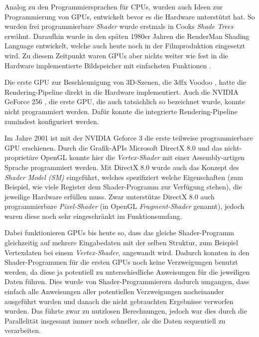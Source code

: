 \documentclass[oneside]{ausarbeitung}
\newcommand*{\quotize}[1]{\glqq #1\grqq}
\begin{document}
Analog zu den Programmiersprachen für \ac{CPU}s, wurden auch Ideen zur Programmierung von \ac{GPU}s, entwickelt bevor es die Hardware unterstützt hat. So wurden frei programmierbare \textit{Shader} wurde erstmals in Cooks \textit{Shade Trees} \cite{cook:shade_trees} erwähnt. Daraufhin wurde in den späten 1980er Jahren die RenderMan Shading Language \cite{pixar:rsl} entwickelt, welche auch heute noch in der Filmproduktion eingesetzt wird. Zu diesem Zeitpunkt waren \ac{GPU}s aber nichts weiter wie fest in die Hardware implementierte Bildspeicher mit einfachsten Funktionen \cite[Vgl.][]{gpu_history}.

Die erste \ac{GPU} zur Beschleunigung von 3D-Szenen, die 3dfx Voodoo \cite{wikipedia:3dfx_voodoo}, hatte die Rendering-Pipeline direkt in die Hardware implementiert. Auch die NVIDIA GeForce 256 \cite{wikipedia:geforce256}, die erste \ac{GPU}, die auch tatsächlich so bezeichnet wurde, konnte nicht programmiert werden. Dafür konnte die integrierte Rendering-Pipeline zumindest konfiguriert werden.

Im Jahre 2001 ist mit der NVIDIA Geforce 3 \cite{wikipedia:geforce3} die erste teilweise programmierbare \ac{GPU} erschienen. Durch die Grafik-APIs Microsoft DirectX 8.0 und das nicht-proprietäre OpenGL konnte hier die \textit{Vertex-Shader} mit einer Assembly-artigen Sprache programmiert werden. Mit DirectX 8.0 wurde auch das Konzept des \textit{Shader Model (SM)} \cite[Vgl.][Shader model comparison]{wikipedia:hlsl} eingeführt, welches spezifiziert welche Eigenschaften (zum Beispiel, wie viele Register dem Shader-Programm zur Verfügung stehen), die jeweilige Hardware erfüllen muss. Zwar unterstütze DirectX 8.0 auch programmierbare \textit{Pixel-Shader} (in OpenGL \textit{Fragment-Shader} genannt), jedoch waren diese noch sehr eingeschränkt im Funktionsumfang.

Dabei funktionieren \ac{GPU}s bis heute so, dass das gleiche Shader-Programm gleichzeitig auf mehrere Eingabedaten mit der selben Struktur, zum Beispiel Vertexdaten bei einem \textit{Vertex-Shader}, angewandt wird. Dadurch konnten in den Shader-Programmen für die ersten \ac{GPU}s noch keine Verzweigungen benutzt werden, da diese ja potentiell zu unterschiedliche Anweisungen für die jeweiligen Daten führen. Dies wurde von Shader-Programmierern dadurch umgangen, dass einfach alle Anweisungen aller potentiellen Verzweigungen nacheinander ausgeführt wurden und danach die nicht gebrauchten Ergebnisse verworfen wurden. Das führte zwar zu \quotize{nutzlosen} Berechnungen, jedoch war dies durch die Parallelität insgesamt immer noch schneller, als die Daten sequentiell zu verarbeiten.
\end{document}
